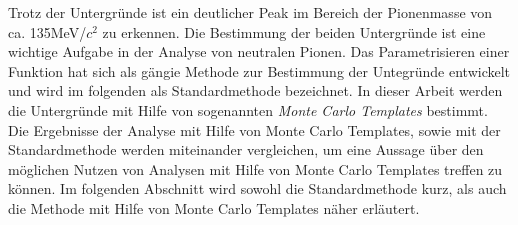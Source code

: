 Trotz der Untergr\"unde ist ein deutlicher Peak im Bereich der Pionenmasse von ca. 135MeV/$c^{2}$ zu erkennen.
Die Bestimmung der beiden Untergr\"unde ist eine wichtige Aufgabe in der Analyse von neutralen Pionen.
Das Parametrisieren einer Funktion hat sich als g\"angie Methode zur Bestimmung der Untegr\"unde entwickelt und wird im folgenden als Standardmethode bezeichnet.
In dieser Arbeit werden die Untergr\"unde mit Hilfe von sogenannten \textit{Monte Carlo Templates} bestimmt.
Die Ergebnisse der Analyse mit Hilfe von Monte Carlo Templates, sowie mit der Standardmethode werden miteinander vergleichen, um eine Aussage \"uber den m\"oglichen Nutzen von Analysen mit Hilfe von Monte Carlo Templates treffen zu k\"onnen.
Im folgenden Abschnitt wird sowohl die Standardmethode kurz, als auch die Methode mit Hilfe von Monte Carlo Templates n\"aher erl\"autert.